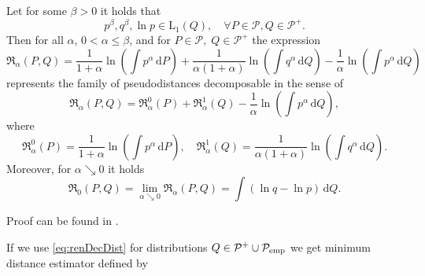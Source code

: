\begin{theorem}
Let for some $\beta>0$ it holds that
	\begin{equation}
			p^\beta, q^\beta,\ln{p} \in \mathrm{L}_1(Q), \quad \forall P \in \mathcal{P}, Q \in \mathcal{P^+}.
			\label{eq:betaCond}
	\end{equation}
	Then for all $\alpha$, $0 < \alpha \leq \beta$, and for $P \in \mathcal{P}, \; Q \in \mathcal{P^+} $ the expression
	\begin{equation}
		\mathfrak{R}_\alpha (P,Q) = \dfrac{1}{1+\alpha}\ln{\left( \int{p^\alpha \,\mathrm{d}P } \right)} +
		\dfrac{1}{\alpha (1+\alpha)}\ln{\left( \int{q^\alpha \,\mathrm{d}Q } \right)} -
		\dfrac{1}{\alpha} \ln{\left( \int{p^\alpha \,\mathrm{d}Q } \right)}
		\label{eq:renDecDist}
	\end{equation}
		represents the family of pseudodistances decomposable in the sense of
	\begin{equation*}
		\mathfrak{R}_\alpha (P,Q) = \mathfrak{R}_\alpha^0 (P) + \mathfrak{R}_\alpha^1 (Q) - \dfrac{1}{\alpha} \ln{\left( \int{p^\alpha \,\mathrm{d}Q } \right)},
	\end{equation*}	
	where
	\begin{equation*}
		\mathfrak{R}_\alpha^0 (P) = \dfrac{1}{1+\alpha}\ln{\left( \int{p^\alpha \,\mathrm{d}P } \right)}, \quad \mathfrak{R}_\alpha^1 (Q) = \dfrac{1}{\alpha (1+\alpha)}\ln{\left( \int{q^\alpha \,\mathrm{d}Q } \right)}.
	\end{equation*}
	Moreover, for $\alpha \searrow 0$ it holds
	\begin{equation*}
		\mathfrak{R}_0 (P,Q) = \lim_{\alpha \searrow 0} \mathfrak{R}_\alpha (P,Q) =  \int{\left( \ln{q} - \ln{p} \right)\,\mathrm{d}Q}.
	\end{equation*}
\end{theorem}
Proof can be found in \cite{Decomposable2011}.

If we use \ref{eq:renDecDist} for distributions $Q \in \mathcal{P}^+ \cup \mathcal{P}_\mathrm{emp}$ we get minimum \ren distance estimator defined by

